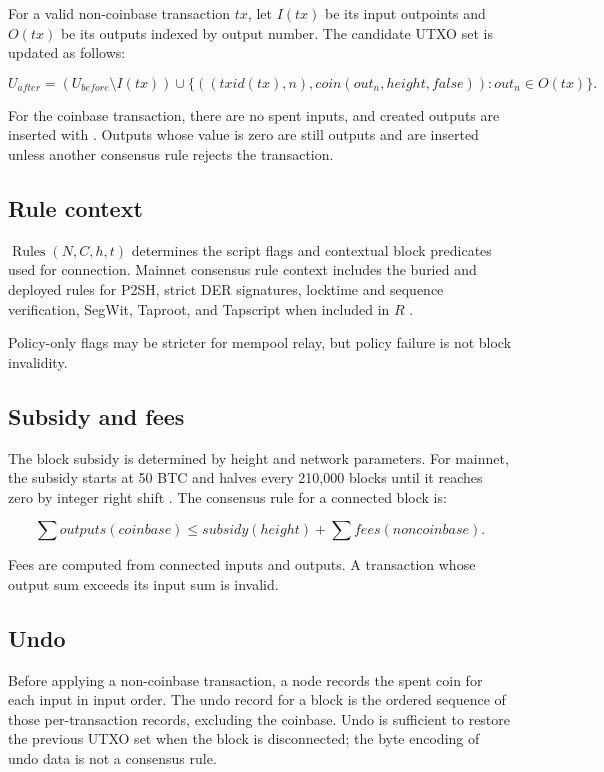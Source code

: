 For a valid non-coinbase transaction $tx$, let $I(tx)$ be its input outpoints
and $O(tx)$ be its outputs indexed by output number. The candidate UTXO set is
updated as follows:

\[
  U_{after} =
    (U_{before} \setminus I(tx)) \cup
    \{((txid(tx), n), coin(out_n, height, false)) : out_n \in O(tx)\}.
\]

For the coinbase transaction, there are no spent inputs, and created outputs
are inserted with . Outputs whose value is zero are still
outputs and are inserted unless another consensus rule rejects the transaction.

\subsection{Rule context}

\(\operatorname{Rules}(N,C,h,t)\) determines the script flags and contextual
block predicates used for connection. Mainnet consensus rule context includes
the buried and deployed rules for P2SH, strict DER signatures, locktime and
sequence verification, SegWit, Taproot, and Tapscript when included in \(R\)
\cite{bip-0016,bip-0065,bip-0066,bip-0068,bip-0112,bip-0113,bip-0141,bip-0143,bip-0147,bip-0341,bip-0342}.

Policy-only flags may be stricter for mempool relay, but policy failure is not
block invalidity.

\subsection{Subsidy and fees}

The block subsidy is determined by height and network parameters. For mainnet,
the subsidy starts at 50 BTC and halves every 210,000 blocks until it reaches
zero by integer right shift \cite{bip-0042}. The consensus rule for a connected
block is:

\[
  \sum outputs(coinbase) \le subsidy(height) + \sum fees(noncoinbase).
\]

Fees are computed from connected inputs and outputs. A transaction whose output
sum exceeds its input sum is invalid.

\subsection{Undo}

Before applying a non-coinbase transaction, a node records the spent coin for
each input in input order. The undo record for a block is the ordered sequence
of those per-transaction records, excluding the coinbase. Undo is sufficient to
restore the previous UTXO set when the block is disconnected; the byte encoding
of undo data is not a consensus rule.

